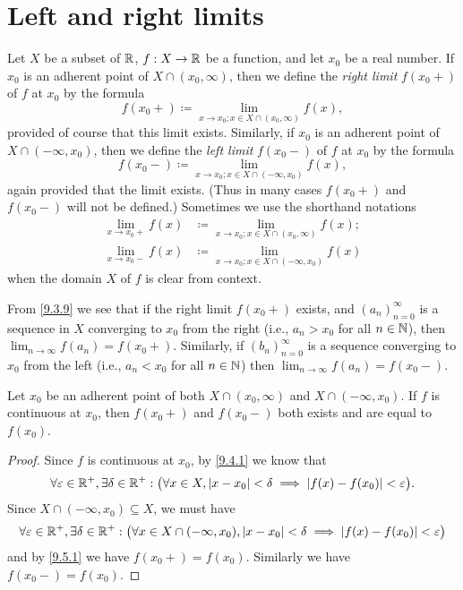 \section{Left and right limits}\label{sec:9.5}

\begin{defn}\label{9.5.1}
  Let \(X\) be a subset of \(\mathbb{R}\), \(f : X \to \mathbb{R}\) be a function, and let \(x_0\) be a real number.
  If \(x_0\) is an adherent point of \(X \cap (x_0, \infty)\), then we define the \emph{right limit} \(f(x_0+)\) of \(f\) at \(x_0\) by the formula
  \[
    f(x_0+) \coloneqq \lim_{x \to x_0 ; x \in X \cap (x_0, \infty)} f(x),
  \]
  provided of course that this limit exists.
  Similarly, if \(x_0\) is an adherent point of \(X \cap (-\infty, x_0)\), then we define the \emph{left limit} \(f(x_0-)\) of \(f\) at \(x_0\) by the formula
  \[
    f(x_0-) \coloneqq \lim_{x \to x_0 ; x \in X \cap (-\infty, x_0)} f(x),
  \]
  again provided that the limit exists.
  (Thus in many cases \(f(x_0+)\) and \(f(x_0-)\) will not be defined.)
  Sometimes we use the shorthand notations
  \begin{align*}
    \lim_{x \to x_0+} f(x) & \coloneqq \lim_{x \to x_0 ; x \in X \cap (x_0, \infty)} f(x); \\
    \lim_{x \to x_0-} f(x) & \coloneqq \lim_{x \to x_0 ; x \in X \cap (-\infty, x_0)} f(x)
  \end{align*}
  when the domain \(X\) of \(f\) is clear from context.
\end{defn}

\begin{note}
  From \cref{9.3.9} we see that if the right limit \(f(x_0+)\) exists, and \((a_n)_{n = 0}^\infty\) is a sequence in \(X\) converging to \(x_0\) from the right (i.e., \(a_n > x_0\) for all \(n \in \mathbb{N}\)), then \(\lim_{n \to \infty} f(a_n) = f(x_0+)\).
  Similarly, if \((b_n)_{n = 0}^\infty\) is a sequence converging to \(x_0\) from the left (i.e., \(a_n < x_0\) for all \(n \in \mathbb{N}\)) then \(\lim_{n \to \infty} f(a_n) = f(x_0-)\).
\end{note}

\begin{ac}\label{ac:9.5.1}
  Let \(x_0\) be an adherent point of both \(X \cap (x_0, \infty)\) and \(X \cap (-\infty, x_0)\).
  If \(f\) is continuous at \(x_0\), then \(f(x_0+)\) and \(f(x_0-)\) both exists and are equal to \(f(x_0)\).
\end{ac}

\begin{proof}
  Since \(f\) is continuous at \(x_0\), by \cref{9.4.1} we know that
  \[
    \forall \varepsilon \in \mathbb{R}^+, \exists \delta \in \mathbb{R}^+ : \big(\forall x \in X, \left\lvert x - x_0\right\rvert < \delta \implies \left\lvert f(x) - f(x_0)\right\rvert < \varepsilon\big).
  \]
  Since \(X \cap (-\infty, x_0) \subseteq X\), we must have
  \[
    \forall \varepsilon \in \mathbb{R}^+, \exists \delta \in \mathbb{R}^+ : \big(\forall x \in X \cap (-\infty, x_0), \left\lvert x - x_0\right\rvert < \delta \implies \left\lvert f(x) - f(x_0)\right\rvert < \varepsilon\big)
  \]
  and by \cref{9.5.1} we have \(f(x_0+) = f(x_0)\).
  Similarly we have \(f(x_0-) = f(x_0)\).
\end{proof}

